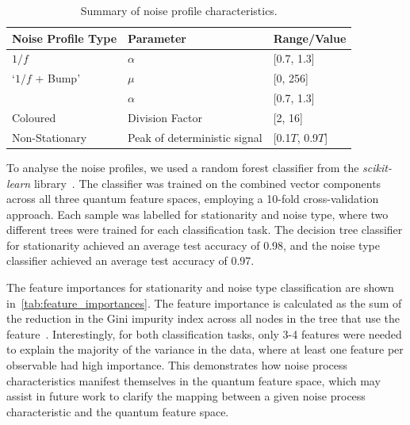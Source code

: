 \documentclass[12pt]{iopart}
\begin{document}
\begin{table}[h!]
    \centering
    \begin{tabular}{|l|l|l|}
        \hline
        \textbf{Noise Profile Type} & \textbf{Parameter}           & \textbf{Range/Value} \\ \hline
        $1/f$                       & $\alpha$                     & [0.7, 1.3]           \\ \hline
        `$1/f$ + Bump'              & $\mu$                        & [0, 256]             \\ \cline{2-3}
                                    & $\alpha$                     & [0.7, 1.3]           \\ \hline
        Coloured                    & Division Factor              & [2, 16]              \\ \hline
        Non-Stationary              & Peak of deterministic signal & [0.1$T$, 0.9$T$]     \\ \hline
    \end{tabular}
    \caption{Summary of noise profile characteristics.}
    \label{tab:noise_params}
\end{table}

To analyse the noise profiles, we used a random forest classifier from the \textit{scikit-learn} library~\cite{scikit-learn}. The classifier was trained on the combined vector components across all three quantum feature spaces, employing a 10-fold cross-validation approach. Each sample was labelled for stationarity and noise type, where two different trees were trained for each classification task. The decision tree classifier for stationarity achieved an average test accuracy of 0.98, and the noise type classifier achieved an average test accuracy of 0.97.

The feature importances for stationarity and noise type classification are shown in~\cref{tab:feature_importances}. The feature importance is calculated as the sum of the reduction in the Gini impurity index across all nodes in the tree that use the feature~\cite{scikit-learn}. Interestingly, for both classification tasks, only 3-4 features were needed to explain the majority of the variance in the data, where at least one feature per observable had high importance. This demonstrates how noise process characteristics manifest themselves in the quantum feature space, which may assist in future work to clarify the mapping between a given noise process characteristic and the quantum feature space.
\end{document}
